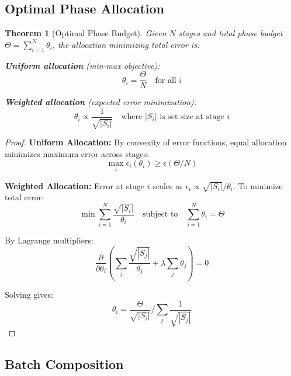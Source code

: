 \documentclass[11pt,letterpaper]{article}
\newtheorem{theorem}{Theorem}
\begin{document}
\subsection{Optimal Phase Allocation}

\begin{theorem}[Optimal Phase Budget]
\label{thm:optimal_phase}
Given $N$ stages and total phase budget $\Theta = \sum_{i=1}^N \theta_i$, the allocation minimizing total error is:

\textbf{Uniform allocation} (min-max objective):
\begin{equation}
\theta_i = \frac{\Theta}{N} \quad \text{for all } i
\end{equation}

\textbf{Weighted allocation} (expected error minimization):
\begin{equation}
\theta_i \propto \frac{1}{\sqrt{|S_i|}} \quad \text{where } |S_i| \text{ is set size at stage } i
\end{equation}
\end{theorem}

\begin{proof}
\textbf{Uniform Allocation:} By convexity of error functions, equal allocation minimizes maximum error across stages:
\begin{equation}
\max_i \epsilon_i(\theta_i) \geq \epsilon(\Theta/N)
\end{equation}

\textbf{Weighted Allocation:} Error at stage $i$ scales as $\epsilon_i \propto \sqrt{|S_i|}/\theta_i$. To minimize total error:
\begin{equation}
\min \sum_{i=1}^N \frac{\sqrt{|S_i|}}{\theta_i} \quad \text{subject to} \quad \sum_{i=1}^N \theta_i = \Theta
\end{equation}

By Lagrange multipliers:
\begin{equation}
\frac{\partial}{\partial \theta_i}\left(\sum_j \frac{\sqrt{|S_j|}}{\theta_j} + \lambda \sum_j \theta_j\right) = 0
\end{equation}

Solving gives:
\begin{equation}
\theta_i = \frac{\Theta}{\sqrt{|S_i|}} / \sum_j \frac{1}{\sqrt{|S_j|}}
\end{equation}
\end{proof}

\subsection{Batch Composition}
\end{document}
